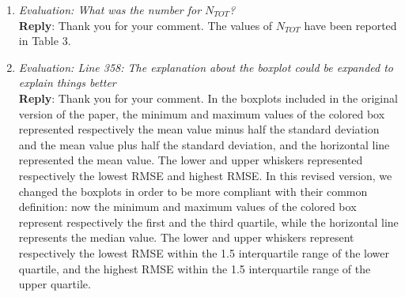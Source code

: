 \documentclass[11pt, technote, letterpaper, oneside, onecolumn]{IEEEtran}
\begin{document}
\begin{enumerate}
\item \textit{Evaluation: What was the number for $N_{TOT}$?\\}
\textbf{Reply}: Thank you for your comment. The values of $N_{TOT}$ have been reported in Table 3.

\item \textit{Evaluation: Line 358: The explanation about the boxplot could be expanded to explain things better\\}
\textbf{Reply}: Thank you for your comment. In the boxplots included in the original version of the paper,  the minimum and maximum values of the colored box represented respectively the mean value minus half the standard deviation and the mean value plus half the standard deviation, and the horizontal line represented the mean value. The lower and upper whiskers represented respectively the lowest RMSE and highest RMSE. In this revised version, we changed the boxplots in order to be more compliant with their common definition: now the minimum and maximum values of the colored box represent respectively the first and the third quartile, while the horizontal line represents the median value. The lower and upper whiskers represent respectively the lowest RMSE within the 1.5 interquartile range of the lower quartile, and the highest RMSE within the 1.5 interquartile range of the upper quartile.


\end{enumerate}
\end{document}
